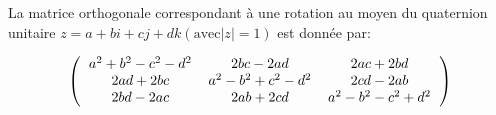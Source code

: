 La matrice orthogonale correspondant à une rotation au moyen du quaternion 
unitaire $z = a + bi + cj + dk (\text{avec} |z| = 1)$ est donnée par:

\[
\left(
\begin{tabular}{c c c}
$a^2+b^2-c^2-d^2$ & $2bc-2ad$ & $2ac+2bd$ \\
$2ad + 2bc$ & $a^2-b^2+c^2-d^2$ & $2cd-2ab$ \\
$2bd-2ac$ & $2ab+2cd$ & $a^2-b^2-c^2+d^2$ \\
\end{tabular}
\right)
\]